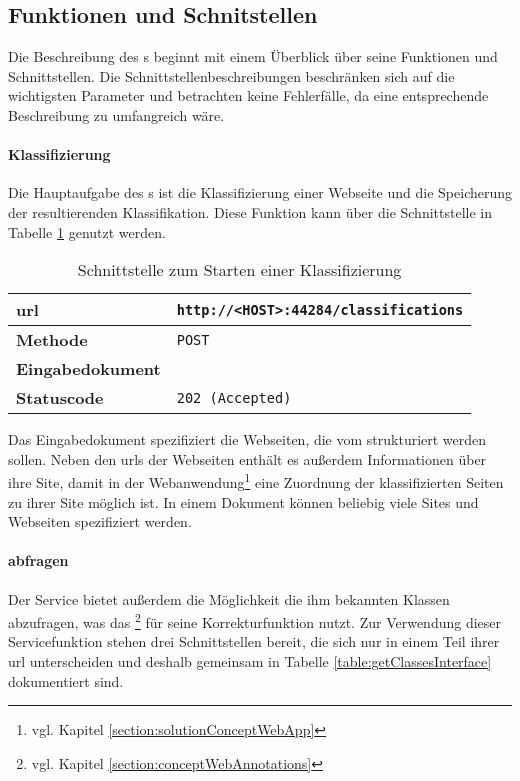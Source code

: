 \subsection{Funktionen und Schnitstellen}
    \label{section:solutionDetailsClassificationServiceFunctions}
    Die Beschreibung des {\classificationService}s beginnt mit einem
    Überblick über seine Funktionen und Schnittstellen.
    Die Schnittstellenbeschreibungen beschränken sich auf die wichtigsten
    Parameter und betrachten keine Fehlerfälle,
    da eine entsprechende Beschreibung zu umfangreich wäre.

    \paragraph{Klassifizierung}
    Die Hauptaufgabe des {\classificationService}s ist die Klassifizierung einer Webseite
    und die Speicherung der resultierenden Klassifikation.
    Diese Funktion kann über die Schnittstelle in Tabelle \ref{table:startClassificationInterface} genutzt werden.

    \begin{table}[htb]
        \centering
        \begin{tabular}{|l|l|}
        \hline
        \textbf{\gls{url}} & \texttt{http://<HOST>:44284/classifications}\\
        \hline
        \textbf{Methode} & \texttt{POST}\\
        \hline
        \textbf{Eingabedokument} & \\
        \hline
        \textbf{Statuscode} & \texttt{202 (Accepted)}\\
        \hline
        \end{tabular}
        \caption{Schnittstelle zum Starten einer Klassifizierung}
        \label{table:startClassificationInterface}
    \end{table}

    Das Eingabedokument spezifiziert die Webseiten,
    die vom {\classificationService} strukturiert werden sollen.
    Neben den \glspl{url} der Webseiten enthält es außerdem Informationen über ihre Site,
    damit in der Webanwendung\footnote{vgl. Kapitel \ref{section:solutionConceptWebApp}}
    eine Zuordnung der klassifizierten Seiten zu ihrer Site möglich ist.
    In einem Dokument können beliebig viele Sites und Webseiten spezifiziert werden.

    \paragraph{{\classificationModel} abfragen}
    Der Service bietet außerdem die Möglichkeit die ihm bekannten Klassen abzufragen,
    was das {\annotatorPlugin}\footnote{vgl. Kapitel \ref{section:conceptWebAnnotations}}
    für seine Korrekturfunktion nutzt.
    Zur Verwendung dieser Servicefunktion stehen drei Schnittstellen bereit,
    die sich nur in einem Teil ihrer \gls{url} unterscheiden und deshalb gemeinsam in
    Tabelle \ref{table:getClassesInterface} dokumentiert sind.

